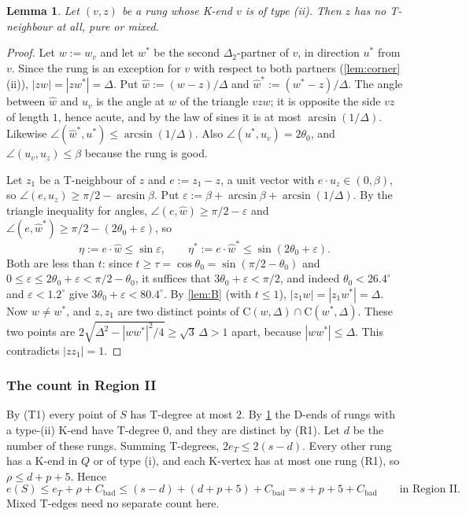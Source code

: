 \documentclass[11pt]{amsart}
\newtheorem{lemma}[theorem]{Lemma}
\theoremstyle{definition}
\theoremstyle{remark}
\newcommand{\Dt}{\Delta_2}
\newcommand{\eps}{\varepsilon}
\newcommand{\Cc}{\mathrm{C}}      %
\begin{document}
\begin{lemma}\label{lem:C}
Let $(v,z)$ be a rung whose K-end $v$ is of type \textup{(ii)}. Then $z$ has no T-neighbour at all, pure or mixed.
\end{lemma}
\begin{proof}
Let $w:=w_v$ and let $w^*$ be the second $\Dt$-partner of $v$, in direction $u^*$ from $v$. Since the rung is an exception for $v$ with respect to both partners (\cref{lem:corner}(ii)), $|zw|=|zw^*|=\Delta$. Put $\hat w:=(w-z)/\Delta$ and $\hat w^*:=(w^*-z)/\Delta$. The angle between $\hat w$ and $u_v$ is the angle at $w$ of the triangle $vzw$; it is opposite the side $vz$ of length $1$, hence acute, and by the law of sines it is at most $\arcsin(1/\Delta)$. Likewise $\angle(\hat w^*,u^*)\le\arcsin(1/\Delta)$. Also $\angle(u^*,u_v)=2\theta_0$, and $\angle(u_v,u_z)\le\beta$ because the rung is good.

Let $z_1$ be a T-neighbour of $z$ and $e:=z_1-z$, a unit vector with $e\cdot u_z\in(0,\beta)$, so $\angle(e,u_z)\ge\pi/2-\arcsin\beta$. Put $\eps:=\beta+\arcsin\beta+\arcsin(1/\Delta)$. By the triangle inequality for angles, $\angle(e,\hat w)\ge\pi/2-\eps$ and $\angle(e,\hat w^*)\ge\pi/2-(2\theta_0+\eps)$, so
\[
\eta:=e\cdot\hat w\le\sin\eps,\qquad \eta^*:=e\cdot\hat w^*\le\sin(2\theta_0+\eps).
\]
Both are less than $t$: since $t\ge\tau=\cos\theta_0=\sin(\pi/2-\theta_0)$ and $0\le\eps\le2\theta_0+\eps<\pi/2-\theta_0$, it suffices that $3\theta_0+\eps<\pi/2$, and indeed $\theta_0<26.4^\circ$ and $\eps<1.2^\circ$ give $3\theta_0+\eps<80.4^\circ$. By \cref{lem:B} (with $t\le1$), $|z_1w|=|z_1w^*|=\Delta$. Now $w\neq w^*$, and $z,z_1$ are two distinct points of $\Cc(w,\Delta)\cap\Cc(w^*,\Delta)$. These two points are $2\sqrt{\Delta^2-|ww^*|^2/4}\ge\sqrt3\,\Delta>1$ apart, because $|ww^*|\le\Delta$. This contradicts $|zz_1|=1$.
\end{proof}

\subsubsection*{The count in Region II}
By (T1) every point of $S$ has T-degree at most $2$. By \cref{lem:C} the D-ends of rungs with a type-(ii) K-end have T-degree $0$, and they are distinct by (R1). Let $d$ be the number of these rungs. Summing T-degrees, $2e_T\le2(s-d)$. Every other rung has a K-end in $Q$ or of type (i), and each K-vertex has at most one rung (R1), so $\rho\le d+p+5$. Hence
\[
e(S)\le e_T+\rho+C_{\mathrm{bad}}\le (s-d)+(d+p+5)+C_{\mathrm{bad}}=s+p+5+C_{\mathrm{bad}}\qquad\text{in Region II.}
\]
Mixed T-edges need no separate count here.
\end{document}
